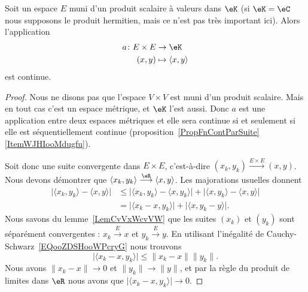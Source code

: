 \begin{proposition}          \label{PROPooKDGOooDjWQct}
    Soit un espace \( E\) muni d'un produit scalaire à valeurs dans \( \eK\) (si \( \eK=\eC\) nous supposons le produit hermitien, mais ce n'est pas très important ici). Alors l'application
    \begin{equation}
        \begin{aligned}
            a\colon E\times E&\to \eK \\
            (x,y)&\mapsto \langle x, y\rangle
        \end{aligned}
    \end{equation}
    est continue.
\end{proposition}

\begin{proof}
    Nous ne disons pas que l'espace \( V\times V\) est muni d'un produit scalaire. Mais en tout cas c'est un espace métrique, et \( \eK\) l'est aussi. Donc \( a\) est une application entre deux espaces métriques et elle sera continue si et seulement si elle est séquentiellement continue (proposition~\ref{PropFnContParSuite}\ref{ItemWJHIooMdugfu}).

    Soit donc une suite convergente dans \( E\times E\), c'est-à-dire \( (x_k,y_k)\stackrel{E\times E}{\longrightarrow}(x,y)\). Nous devons démontrer que \( \langle x_k, y_k\rangle \stackrel{\eR}{\longrightarrow}\langle x, y\rangle \). Les majorations usuelles donnent
    \begin{subequations}
        \begin{align}
            \big| \langle x_k, y_k\rangle -\langle x, y\rangle  \big|&\leq \big| \langle x_k, y_k\rangle -\langle x, y_k\rangle  \big|+\big| \langle x, y_k\rangle -\langle x, y\rangle  \big|\\
            &=\big| \langle x_k-x, y_k\rangle  \big|+\big| \langle x, y_k-y\rangle  \big|.
        \end{align}
    \end{subequations}
    Nous savons du lemme~\ref{LemCvVxWcvVW} que les suites \( (x_k)\) et \( (y_k)\) sont séparément convergentes : \( x_k\stackrel{E}{\longrightarrow}x\) et \( y_k\stackrel{E}{\longrightarrow}y\). En utilisant l'inégalité de Cauchy-Schwarz~\ref{EQooZDSHooWPcryG} nous trouvons
    \begin{equation}
        \big| \langle x_k-x, y_k\rangle  \big|\leq \| x_k-x \|\| y_k \|.
    \end{equation}
    Nous avons \( \| x_k-x \|\to 0\) et \( \| y_k \|\to \| y \|\), et par la règle du produit de limites dans \( \eR\) nous avons que \( \big| \langle x_k-x, y_k\rangle  \big|\to 0\).
\end{proof}

